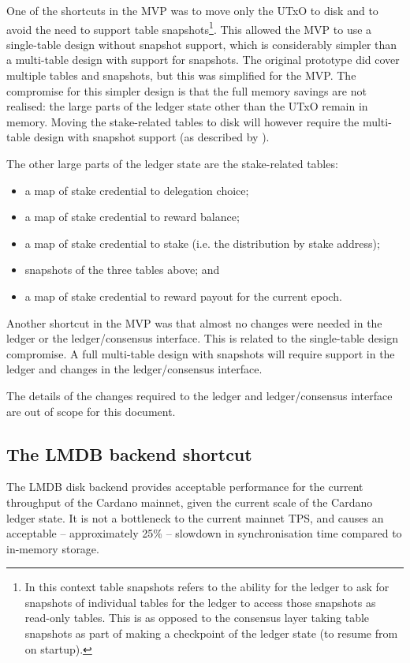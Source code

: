 \documentclass[11pt,a4paper]{article}
\begin{document}
One of the shortcuts in the MVP was to move only the UTxO to disk and to avoid
the need to support table snapshots\footnote{In this context table snapshots
refers to the ability for the ledger to ask for snapshots of individual tables
for the ledger to access those snapshots as read-only tables. This is as
opposed to the consensus layer taking table snapshots as part of making a
checkpoint of the ledger state (to resume from on startup).}.
This allowed the MVP to use a single-table
design without snapshot support, which is considerably simpler than a
multi-table design with support for snapshots. The original prototype did
cover multiple tables and snapshots, but this was simplified for the MVP.
The compromise for this simpler design is that the full memory savings are not
realised: the large parts of the ledger state other than the UTxO remain in
memory. Moving the stake-related tables to disk will however require the
multi-table design with snapshot support (as described by \cite{utxo-db-api}).

The other large parts of the ledger state are the stake-related tables:
\begin{itemize}
\item a map of stake credential to delegation choice;
\item a map of stake credential to reward balance;
\item a map of stake credential to stake (i.e. the distribution by stake address);
\item snapshots of the three tables above; and
\item a map of stake credential to reward payout for the current epoch.
\end{itemize}

Another shortcut in the MVP was that almost no changes were needed in the
ledger or the ledger/consensus interface. This is related to the single-table
design compromise. A full multi-table design with snapshots will require
support in the ledger and changes in the ledger/consensus interface.

The details of the changes required to the ledger and ledger/consensus
interface are out of scope for this document.


\subsection{The LMDB backend shortcut}
\label{sec:lmdb-backend-shortcut}

The LMDB disk backend provides acceptable performance for the current
throughput of the Cardano mainnet, given the current scale of the Cardano
ledger state. It is not a bottleneck to the current mainnet TPS, and causes an
acceptable -- approximately 25\% -- slowdown in synchronisation time compared
to in-memory storage.
\end{document}
